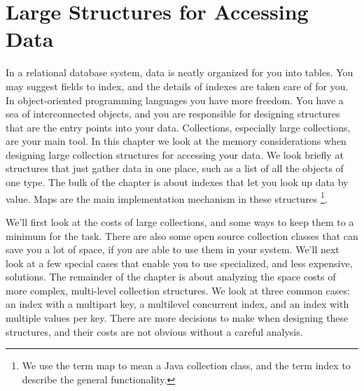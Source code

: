 \chapter{Large Structures for Accessing Data}
\label{chapter:tables-indexes}

In a relational database system, data is neatly organized for you into tables.
You may suggest fields to index, and the details of indexes are
taken care of for you. In object-oriented programming languages
you have more freedom. You have a sea of interconnected objects, and you are responsible for designing structures that are the entry points into your
data. Collections, especially large collections, are your
main tool. In this chapter we look at the memory considerations when
designing large collection structures for accessing your
data. We look briefly
at structures that just gather data in one place, such as a list
of all the objects of one type. The bulk of the chapter is about indexes
that let you look up data by value. Maps are the main implementation
mechanism in these structures \footnote{We use the term map to mean a Java collection class,
and the term index to describe the general functionality.}. 

We'll first look at the costs of large collections, and some ways to keep them
to a minimum for the task. There are also some open source
collection classes that can save you a lot of space, if you are able to use them in your system. 
We'll next look at a few special cases that enable you to use
specialized, and less expensive, solutions. The remainder of the chapter is
about analyzing the space costs of more complex, multi-level collection
structures.  We look at three common cases: an index with a multipart key, a
multilevel concurrent index, and an index with multiple values per key. There are more decisions
to make when designing these structures, and their costs are
not obvious without a careful analysis. 





